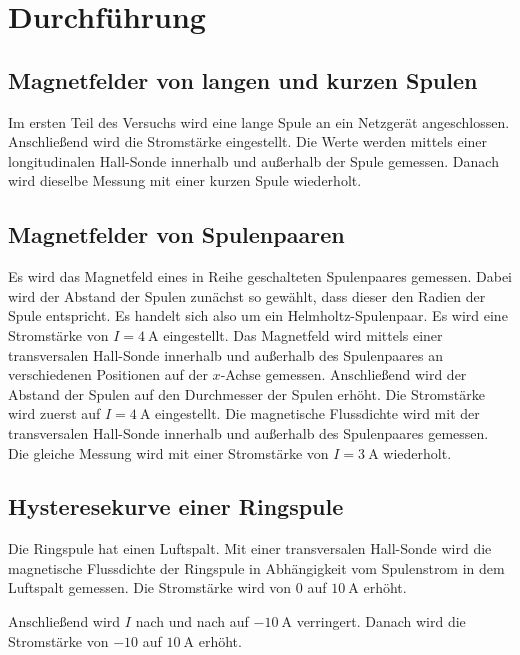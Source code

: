 \section{Durchführung}
\label{sec:Durchfuehrung}

\subsection{Magnetfelder von langen und kurzen Spulen}
Im ersten Teil des Versuchs wird eine lange Spule an ein Netzgerät angeschlossen. 
Anschließend wird die Stromstärke eingestellt.
Die Werte werden mittels einer longitudinalen Hall-Sonde innerhalb und außerhalb der
Spule gemessen. Danach wird dieselbe Messung mit einer kurzen Spule 
wiederholt. 

\subsection{Magnetfelder von Spulenpaaren} %
Es wird das Magnetfeld eines in Reihe geschalteten Spulenpaares gemessen. Dabei wird
der Abstand der Spulen zunächst so gewählt, dass dieser den Radien der Spule entspricht.
Es handelt sich also um ein Helmholtz-Spulenpaar. Es wird eine Stromstärke von
$I= \SI{4}{\ampere}$ eingestellt. Das Magnetfeld wird mittels einer 
transversalen Hall-Sonde innerhalb und außerhalb des Spulenpaares an verschiedenen Positionen auf der $x$-Achse gemessen.
\newline
Anschließend wird der Abstand der Spulen auf den Durchmesser der Spulen erhöht.
Die Stromstärke wird zuerst auf $I= \SI{4}{\ampere}$ eingestellt.
Die magnetische Flussdichte wird mit der transversalen Hall-Sonde innerhalb und
außerhalb des Spulenpaares gemessen.
\newline
Die gleiche Messung wird mit einer Stromstärke von
$I = \SI{3}{\ampere}$ wiederholt.

\subsection {Hysteresekurve einer Ringspule} 
Die Ringspule hat einen Luftspalt. Mit einer transversalen Hall-Sonde wird die 
magnetische Flussdichte der Ringspule in Abhängigkeit vom Spulenstrom in dem Luftspalt gemessen.
Die Stromstärke wird von $\num{0}$ auf $\SI{10}{\ampere}$ erhöht.%

\noindent Anschließend wird $I$ nach und nach auf $\SI{-10}{\ampere}$ verringert. Danach wird die Stromstärke
von $\num{-10}$ auf $\SI{10}{\ampere}$ erhöht.


